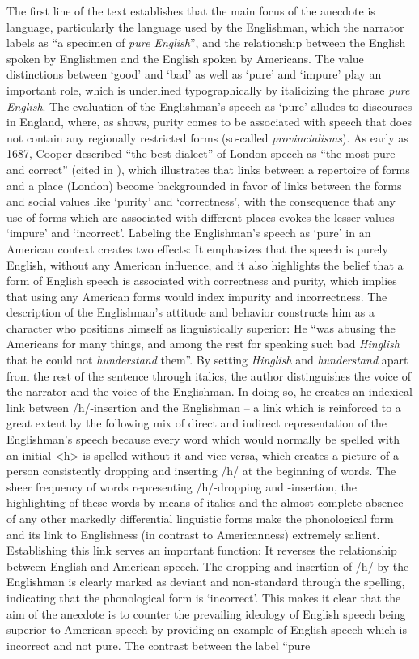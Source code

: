 The first line of the text establishes that the main focus of the anecdote is language, particularly the language used by the Englishman, which the narrator labels as “a specimen of \emph{pure English}”, and the relationship between the English spoken by Englishmen and the English spoken by Americans. The value distinctions between ‘good’ and ‘bad’ as well as ‘pure’ and ‘impure’ play an important role, which is underlined typographically by italicizing the phrase \emph{pure English}. The evaluation of the Englishman’s speech as ‘pure’ alludes to discourses in England, where, as \citet{Mugglestone2003} shows, purity comes to be associated with speech that does not contain any regionally restricted forms (so-called \textit{provincialisms}). As early as 1687, Cooper described “the best dialect” of London speech as “the most pure and correct” (cited in \citealt[15]{Mugglestone2003}), which illustrates that links between a repertoire of forms and a place (London) become backgrounded in favor of links between the forms and social values like ‘purity’ and ‘correctness’, with the consequence that any use of forms which are associated with different places evokes the lesser values ‘impure’ and ‘incorrect’. Labeling the Englishman’s speech as ‘pure’ in an American context creates two effects: It emphasizes that the speech is purely English, without any American influence, and it also highlights the belief that a form of English speech is associated with correctness and purity, which implies that using any American forms would index impurity and incorrectness. The description of the Englishman’s attitude and behavior constructs him as a character who positions himself as linguistically superior: He “was abusing the Americans for many things, and among the rest for speaking such bad \emph{Hinglish} that he could not \emph{hunderstand} them”. By setting \emph{Hinglish} and \emph{hunderstand} apart from the rest of the sentence through italics, the author distinguishes the voice of the narrator and the voice of the Englishman. In doing so, he creates an indexical link between /h/-insertion and the Englishman – a link which is reinforced to a great extent by the following mix of direct and indirect representation of the Englishman’s speech because every word which would normally be spelled with an initial <h> is spelled without it and vice versa, which creates a picture of a person consistently dropping and inserting /h/ at the beginning of words. The sheer frequency of words representing /h/-dropping and -insertion, the highlighting of these words by means of italics and the almost complete absence of any other markedly differential linguistic forms make the phonological form and its link to Englishness (in contrast to Americanness) extremely salient. Establishing this link serves an important function: It reverses the relationship between English and American speech. The dropping and insertion of /h/ by the Englishman is clearly marked as deviant and non-standard through the spelling, indicating that the phonological form is ‘incorrect’. This makes it clear that the aim of the anecdote is to counter the prevailing ideology of English speech being superior to American speech by providing an example of English speech which is incorrect and not pure. The contrast between the label “pure 